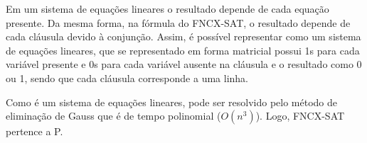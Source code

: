 \documentclass[12pt]{article}
\begin{document}
\begin{enumerate}
{	Em um sistema de equações lineares o resultado depende de cada equação presente. Da mesma forma, na fórmula do FNCX-SAT, o resultado depende de cada cláusula devido à conjunção. Assim, é possível representar como um sistema de equações lineares, que se representado em forma matricial possui 1s para cada variável presente e 0s para cada variável ausente na cláusula e o resultado como 0 ou 1, sendo que cada cláusula corresponde a uma linha.

	Como é um sistema de equações lineares, pode ser resolvido pelo método de eliminação de Gauss que é de tempo polinomial (${O(n^3)}$). Logo, FNCX-SAT pertence a P.
}
\end{enumerate}
\end{document}
